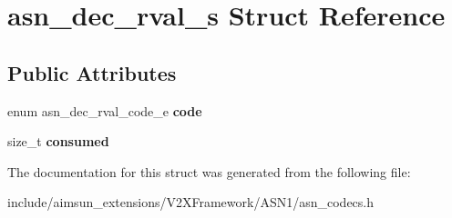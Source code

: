 \hypertarget{structasn__dec__rval__s}{}\section{asn\+\_\+dec\+\_\+rval\+\_\+s Struct Reference}
\label{structasn__dec__rval__s}
\subsection*{Public Attributes}
\begin{DoxyCompactItemize}
\item 
enum asn\+\_\+dec\+\_\+rval\+\_\+code\+\_\+e {\bfseries code}\hypertarget{structasn__dec__rval__s_a5c379ac0e3d6d27d687b6a439123b47f}{}\label{structasn__dec__rval__s_a5c379ac0e3d6d27d687b6a439123b47f}

\item 
size\+\_\+t {\bfseries consumed}\hypertarget{structasn__dec__rval__s_a200882bbdf36418b1a624463b3efad90}{}\label{structasn__dec__rval__s_a200882bbdf36418b1a624463b3efad90}

\end{DoxyCompactItemize}


The documentation for this struct was generated from the following file\+:\begin{DoxyCompactItemize}
\item 
include/aimsun\+\_\+extensions/\+V2\+X\+Framework/\+A\+S\+N1/asn\+\_\+codecs.\+h\end{DoxyCompactItemize}
